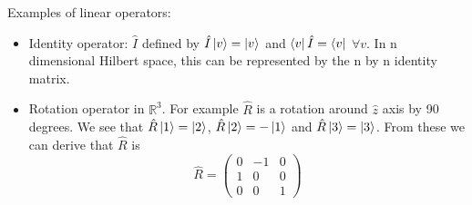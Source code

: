 Examples of linear operators:
\begin{itemize}
\item Identity operator: $\hat{I}$ defined by $\hat{I} \ket{v} = \ket{v}$ and $\bra{v} \hat{I} = \bra{v}$ $\forall v$. In n dimensional Hilbert space, this can be represented by the n by n identity matrix.
\item Rotation operator in $\mathbb{R}^3$. For example $\hat{R}$ is a rotation around $\hat{z}$ axis by 90 degrees. We see that $\hat{R} \ket{1} = \ket{2}$, $\hat{R} \ket{2} = - \ket{1}$ and $\hat{R} \ket{3} = \ket{3}$. From these we can derive that $\hat{R}$ is $$\hat{R} = \begin{pmatrix} 0 & -1 & 0 \\ 1 & 0 & 0 \\ 0 & 0 & 1 \end{pmatrix}$$
\end{itemize}